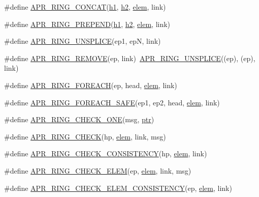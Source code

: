\begin{DoxyCompactItemize}
\item 
\#define \hyperlink{group__apr__ring_ga34ee7a0d6daa61117006bb74498ff5aa}{A\+P\+R\+\_\+\+R\+I\+N\+G\+\_\+\+C\+O\+N\+C\+AT}(\hyperlink{group__apr__hash_ga7424aa17231f37fcf2350b861ca9b549}{h1},  \hyperlink{group__apr__hash_gaebeb34ebcc8806faa82df3123f4423cf}{h2},  \hyperlink{structelem}{elem},  link)
\item 
\#define \hyperlink{group__apr__ring_ga4d5aaa9b6f02f96f98f234a0a428474d}{A\+P\+R\+\_\+\+R\+I\+N\+G\+\_\+\+P\+R\+E\+P\+E\+ND}(\hyperlink{group__apr__hash_ga7424aa17231f37fcf2350b861ca9b549}{h1},  \hyperlink{group__apr__hash_gaebeb34ebcc8806faa82df3123f4423cf}{h2},  \hyperlink{structelem}{elem},  link)
\item 
\#define \hyperlink{group__apr__ring_ga1d725b0a9ea7ff88f771e37ec130c13b}{A\+P\+R\+\_\+\+R\+I\+N\+G\+\_\+\+U\+N\+S\+P\+L\+I\+CE}(ep1,  epN,  link)
\item 
\#define \hyperlink{group__apr__ring_gaab4a57544bdb660ec1e306137387d9d7}{A\+P\+R\+\_\+\+R\+I\+N\+G\+\_\+\+R\+E\+M\+O\+VE}(ep,  link)~\hyperlink{group__apr__ring_ga1d725b0a9ea7ff88f771e37ec130c13b}{A\+P\+R\+\_\+\+R\+I\+N\+G\+\_\+\+U\+N\+S\+P\+L\+I\+CE}((ep), (ep), link)
\item 
\#define \hyperlink{group__apr__ring_ga7dc7b26e72f836d27e8e0c87da14fb4a}{A\+P\+R\+\_\+\+R\+I\+N\+G\+\_\+\+F\+O\+R\+E\+A\+CH}(ep,  head,  \hyperlink{structelem}{elem},  link)
\item 
\#define \hyperlink{group__apr__ring_ga9a1e91eef86d676d1622dc5b9ddd6f89}{A\+P\+R\+\_\+\+R\+I\+N\+G\+\_\+\+F\+O\+R\+E\+A\+C\+H\+\_\+\+S\+A\+FE}(ep1,  ep2,  head,  \hyperlink{structelem}{elem},  link)
\item 
\#define \hyperlink{group__apr__ring_ga33c7cfbea7c688c7bd0a3d36609f318b}{A\+P\+R\+\_\+\+R\+I\+N\+G\+\_\+\+C\+H\+E\+C\+K\+\_\+\+O\+NE}(msg,  \hyperlink{group__APACHE__CORE__DAEMON_gaad7fdd8e91a6edc850f20f2fede630a9}{ptr})
\item 
\#define \hyperlink{group__apr__ring_ga97bb4dcc313145496e6b05855f9c6e2b}{A\+P\+R\+\_\+\+R\+I\+N\+G\+\_\+\+C\+H\+E\+CK}(hp,  \hyperlink{structelem}{elem},  link,  msg)
\item 
\#define \hyperlink{group__apr__ring_ga6b0f2091527ee9c7a1511cb6f172a0a7}{A\+P\+R\+\_\+\+R\+I\+N\+G\+\_\+\+C\+H\+E\+C\+K\+\_\+\+C\+O\+N\+S\+I\+S\+T\+E\+N\+CY}(hp,  \hyperlink{structelem}{elem},  link)
\item 
\#define \hyperlink{group__apr__ring_ga5500df0e96dea1a3258f1e92b28fea0a}{A\+P\+R\+\_\+\+R\+I\+N\+G\+\_\+\+C\+H\+E\+C\+K\+\_\+\+E\+L\+EM}(ep,  \hyperlink{structelem}{elem},  link,  msg)
\item 
\#define \hyperlink{group__apr__ring_gab7070ae5cf69bf16178a0e0e397c5b38}{A\+P\+R\+\_\+\+R\+I\+N\+G\+\_\+\+C\+H\+E\+C\+K\+\_\+\+E\+L\+E\+M\+\_\+\+C\+O\+N\+S\+I\+S\+T\+E\+N\+CY}(ep,  \hyperlink{structelem}{elem},  link)
\end{DoxyCompactItemize}


